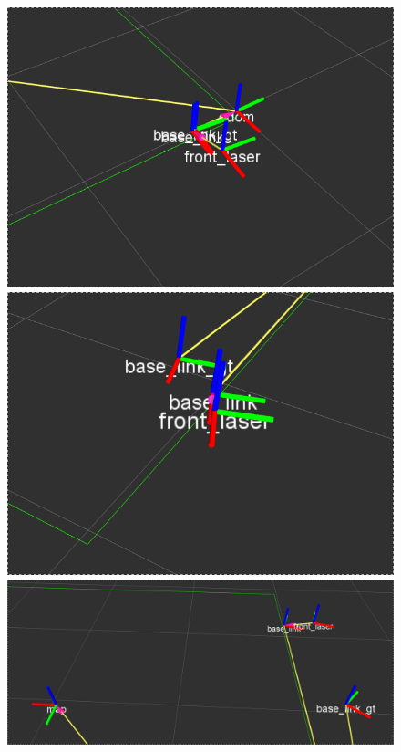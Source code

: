 \begin{figure}[!htb]
  \includegraphics[width=\linewidth]{imagenesExpLazoCerrado/k4/1.png}
\endminipage\hfill
{}
  \includegraphics[width=\linewidth]{imagenesExpLazoCerrado/k4/2.png}
\endminipage\hfill
{}%
  \includegraphics[width=\linewidth]{imagenesExpLazoCerrado/k4/4.png}
\endminipage
\end{figure}
\FloatBarrier

